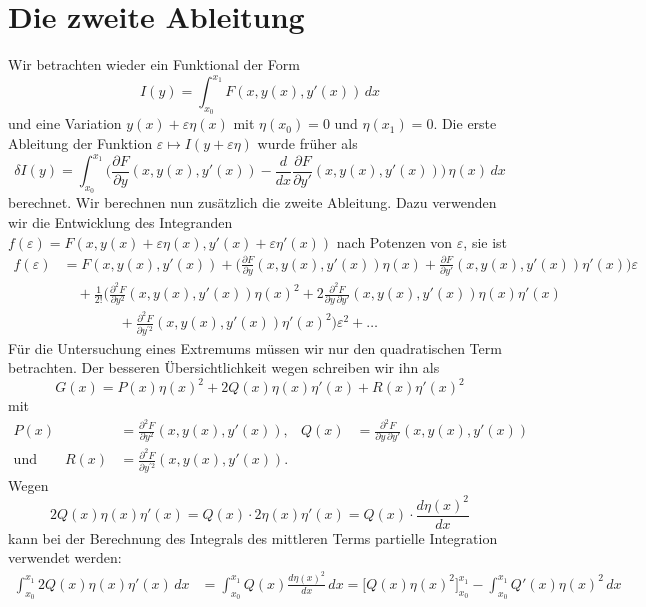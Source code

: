 %
%
%
\section{Die zweite Ableitung
\label{buch:variation2:section:zweiteableitung}}
Wir betrachten wieder ein Funktional der Form
\[
I(y)
=
\int_{x_0}^{x_1}
F(x,y(x),y'(x))
\,dx
\]
und eine Variation $y(x)+\varepsilon\eta(x)$ mit $\eta(x_0)=0$
und $\eta(x_1)=0$.
Die erste Ableitung der Funktion $\varepsilon\mapsto I(y+\varepsilon\eta)$
wurde früher als
\[
\delta I(y)
=
\int_{x_0}^{x_1}
\biggl(
\frac{\partial F}{\partial y}(x,y(x),y'(x))
-
\frac{d}{dx}
\frac{\partial F}{\partial y'}(x,y(x),y'(x))
\biggr)
\,
\eta(x)
\,dx
\]
berechnet.
Wir berechnen nun zusätzlich die zweite Ableitung.
Dazu verwenden wir die Entwicklung des Integranden
$f(\varepsilon) = F(x,y(x)+\varepsilon\eta(x),y'(x)+\varepsilon\eta'(x))$
nach Potenzen von $\varepsilon$, sie ist
\begin{align*}
f(\varepsilon)
&=
F(x,y(x),y'(x))
+
\biggl(
\frac{\partial F}{\partial y}(x,y(x),y'(x))\eta(x)
+
\frac{\partial F}{\partial y'}(x,y(x),y'(x))\eta'(x)
\biggr)
\varepsilon
\\
&\quad
+
\frac{1}{2!}
\biggl(
\frac{\partial^2 F}{\partial y^2}(x,y(x),y'(x))
\eta(x)^2
+
2
\frac{\partial^2 F}{\partial y\,\partial y'}(x,y(x),y'(x))
\eta(x)\eta'(x)
\\
&\qquad\qquad
+
\frac{\partial^2 F}{\partial y^{\prime 2}}(x,y(x),y'(x))
\eta'(x)^2
\biggr)
\varepsilon^2
+
\dots
\end{align*}
Für die Untersuchung eines Extremums müssen wir nur den quadratischen
Term betrachten.
Der besseren Übersichtlichkeit wegen schreiben wir ihn als
\[
G(x)
=
P(x)\eta(x)^2 + 2Q(x) \eta(x)\eta'(x) + R(x)\eta'(x)^2
\]
mit
\begin{align*}
P(x) &= \frac{\partial^2 F}{\partial y^2} (x,y(x),y'(x)),
&
Q(x) &= \frac{\partial^2 F}{\partial y\,\partial y'} (x,y(x),y'(x))
\\
\text{und}
\qquad
R(x) &= \frac{\partial^2 F}{\partial y^{\prime 2}} (x,y(x),y'(x)).
\end{align*}
Wegen
\[
2Q(x)\eta(x)\eta'(x)
=
Q(x)\cdot 2\eta(x)\eta'(x)
=
Q(x)\cdot \frac{d\eta(x)^2}{dx}
\]
kann bei der Berechnung des Integrals des mittleren Terms partielle
Integration verwendet werden:
\begin{align*}
\int_{x_0}^{x_1}
2Q(x)\eta(x)\eta'(x)
\,dx
&=
\int_{x_0}^{x_1}
Q(x) \frac{d\eta(x)^2}{dx}
\,dx
=
\biggl[Q(x)\eta(x)^2\biggr]_{x_0}^{x_1}
-
\int_{x_0}^{x_1} Q'(x) \eta(x)^2\,dx
\end{align*}

